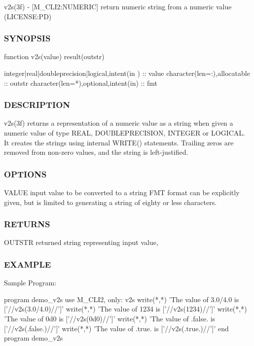 v2s(3f) -\/ \mbox{[}M\+\_\+\+C\+L\+I2\+:N\+U\+M\+E\+R\+IC\mbox{]} return numeric string from a numeric value (L\+I\+C\+E\+N\+SE\+:PD) 

\subsubsection*{S\+Y\+N\+O\+P\+S\+IS}

\begin{DoxyVerb}   function v2s(value) result(outstr)

    integer|real|doubleprecision|logical,intent(in ) :: value
    character(len=:),allocatable :: outstr
    character(len=*),optional,intent(in) :: fmt
\end{DoxyVerb}


\subsubsection*{D\+E\+S\+C\+R\+I\+P\+T\+I\+ON}

\begin{DoxyVerb}v2s(3f) returns a representation of a numeric value as a
string when given a numeric value of type REAL, DOUBLEPRECISION,
INTEGER or LOGICAL. It creates the strings using internal WRITE()
statements. Trailing zeros are removed from non-zero values, and the
string is left-justified.
\end{DoxyVerb}


\subsubsection*{O\+P\+T\+I\+O\+NS}

V\+A\+L\+UE input value to be converted to a string F\+MT format can be explicitly given, but is limited to generating a string of eighty or less characters.

\subsubsection*{R\+E\+T\+U\+R\+NS}

O\+U\+T\+S\+TR returned string representing input value,

\subsubsection*{E\+X\+A\+M\+P\+LE}

Sample Program\+: \begin{DoxyVerb}program demo_v2s
use M_CLI2, only: v2s
write(*,*) 'The value of 3.0/4.0 is ['//v2s(3.0/4.0)//']'
write(*,*) 'The value of 1234    is ['//v2s(1234)//']'
write(*,*) 'The value of 0d0     is ['//v2s(0d0)//']'
write(*,*) 'The value of .false. is ['//v2s(.false.)//']'
write(*,*) 'The value of .true. is  ['//v2s(.true.)//']'
end program demo_v2s
\end{DoxyVerb}


